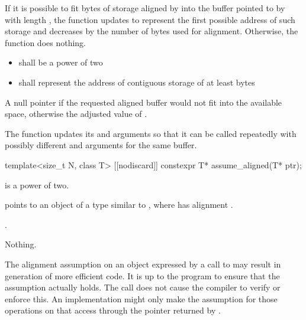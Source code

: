 \begin{itemdescr}
\pnum
\effects If it is possible to fit  bytes
of storage aligned by  into the buffer pointed to by
 with length , the function updates
 to represent the first possible address of such storage
and decreases  by the number of bytes used for alignment.
Otherwise, the function does nothing.

\pnum
\requires

\begin{itemize}
\item {} shall be a power of two

\item {} shall represent the address of contiguous storage of at least
 bytes
\end{itemize}

\pnum
\returns A null pointer if the requested aligned buffer
would not fit into the available space, otherwise the adjusted value
of .

\pnum
\begin{note} The function updates its 
and  arguments so that it can be called repeatedly
with possibly different  and 
arguments for the same buffer.  \end{note}
\end{itemdescr}

%
\begin{itemdecl}
template<size_t N, class T>
  [[nodiscard]] constexpr T* assume_aligned(T* ptr);
\end{itemdecl}

\begin{itemdescr}
\pnum
\mandates
{} is a power of two.

\pnum
\expects
{} points to an object  of
a type similar to ,
where  has alignment .

\pnum
\returns
{}.

\pnum
\throws
Nothing.

\pnum
\begin{note}
The alignment assumption on an object 
expressed by a call to 
may result in generation of more efficient code.
It is up to the program to ensure that the assumption actually holds.
The call does not cause the compiler to verify or enforce this.
An implementation might only make the assumption
for those operations on  that access 
through the pointer returned by .
\end{note}
\end{itemdescr}

